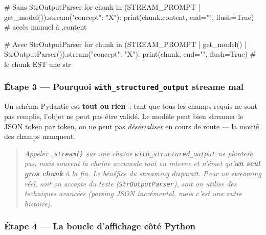 \documentclass[11pt,a4paper]{article}
\begin{document}
\begin{pythoncode}
# Sans StrOutputParser
for chunk in (STREAM_PROMPT | get_model()).stream({"concept": "X"}):
    print(chunk.content, end="", flush=True)  # accès manuel à .content

# Avec StrOutputParser
for chunk in (STREAM_PROMPT | get_model() | StrOutputParser()).stream({"concept": "X"}):
    print(chunk, end="", flush=True)  # le chunk EST une str
\end{pythoncode}

\subsubsection*{Étape 3 — Pourquoi \texttt{with\_structured\_output} streame mal}

\begin{center}
\end{center}

Un schéma Pydantic est \textbf{tout ou rien}~: tant que tous les champs
requis ne sont pas remplis, l'objet ne peut pas être validé. Le modèle
peut bien streamer le JSON token par token, on ne peut pas
\emph{désérialiser} en cours de route — la moitié des champs manquent.

\begin{quote}\itshape
Appeler \texttt{.stream()} sur une chaîne \texttt{with\_structured\_output}
ne plantera \emph{pas}, mais souvent la chaîne accumule tout en interne et
n'émet qu'\textbf{un seul gros chunk} à la fin. Le bénéfice du streaming
disparaît. Pour un streaming réel, soit on accepte du texte
(\texttt{StrOutputParser}), soit on utilise des techniques avancées
(parsing JSON incrémental, mais c'est une autre histoire).
\end{quote}

\subsubsection*{Étape 4 — La boucle d'affichage côté Python}
\end{document}
